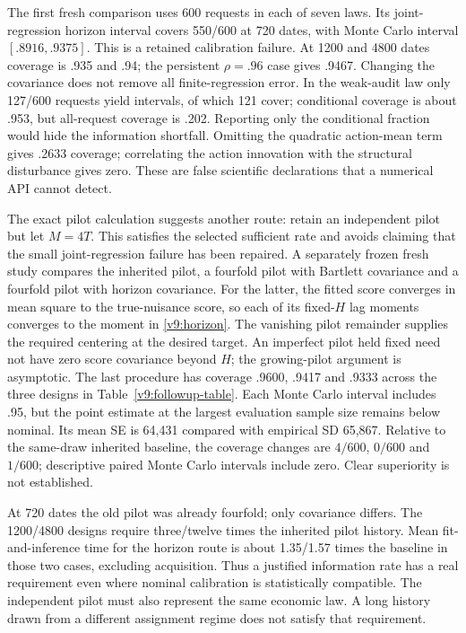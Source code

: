 The first fresh comparison uses 600 requests in each of seven laws. Its
joint-regression horizon interval covers 550/600 at 720 dates, with Monte
Carlo interval $[.8916,.9375]$. This is a retained calibration failure.
At 1200 and 4800 dates coverage is .935 and .94; the persistent $\rho=.96$
case gives .9467. Changing the covariance does not remove all finite-regression
error. In the weak-audit law only 127/600 requests yield intervals, of which
121 cover; conditional coverage is about .953, but all-request coverage is
.202. Reporting only the conditional fraction would hide the information
shortfall. Omitting the quadratic action-mean term gives .2633 coverage;
correlating the action innovation with the structural disturbance gives zero.
These are false scientific declarations that a numerical API cannot detect.

The exact pilot calculation suggests another route: retain an independent
pilot but let $M=4T$. This satisfies the selected sufficient rate and avoids
claiming that the small joint-regression failure has been repaired.
A separately frozen fresh study compares the inherited pilot, a fourfold
pilot with Bartlett covariance and a fourfold pilot with horizon covariance.
For the latter, the fitted score converges in mean square to the true-nuisance
score, so each of its fixed-$H$ lag moments converges to the moment in
\eqref{v9:horizon}. The vanishing pilot remainder supplies the required
centering at the desired target. An imperfect pilot held fixed need not have
zero score covariance beyond $H$; the growing-pilot argument is asymptotic.
The last procedure has coverage .9600, .9417 and .9333 across the three
designs in Table~\ref{v9:followup-table}. Each Monte Carlo interval includes
.95, but the point estimate at the largest evaluation sample size remains
below nominal. Its mean SE is
64,431 compared with empirical SD 65,867. Relative to the same-draw inherited
baseline, the coverage changes are $4/600$, $0/600$ and $1/600$; descriptive
paired Monte Carlo intervals include zero. Clear superiority is not established.

At 720 dates the old pilot was already fourfold; only covariance differs.
The 1200/4800 designs require three/twelve times the inherited pilot history.
Mean fit-and-inference time for the horizon route is about 1.35/1.57 times the
baseline in those two cases, excluding acquisition. Thus a justified
information rate has a real requirement even where nominal calibration is
statistically compatible. The independent pilot must also represent the same
economic law. A long history drawn from a different assignment regime does not
satisfy that requirement.



